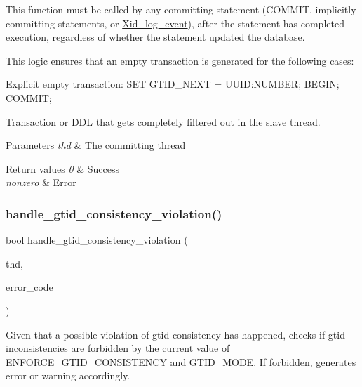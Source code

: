 This function must be called by any committing statement (C\+O\+M\+M\+IT, implicitly committing statements, or \mbox{\hyperlink{classXid__log__event}{Xid\+\_\+log\+\_\+event}}), after the statement has completed execution, regardless of whether the statement updated the database.

This logic ensures that an empty transaction is generated for the following cases\+:


\begin{DoxyItemize}
\item Explicit empty transaction\+: S\+ET G\+T\+I\+D\+\_\+\+N\+E\+XT = \textquotesingle{}U\+U\+ID\+:N\+U\+M\+B\+ER\textquotesingle{}; B\+E\+G\+IN; C\+O\+M\+M\+IT;
\item Transaction or D\+DL that gets completely filtered out in the slave thread.
\end{DoxyItemize}


\begin{DoxyParams}{Parameters}
{\em thd} & The committing thread\\
\hline
\end{DoxyParams}

\begin{DoxyRetVals}{Return values}
{\em 0} & Success \\
\hline
{\em nonzero} & Error \\
\hline
\end{DoxyRetVals}
\mbox{\label{group__Binary__Log_ga9f038ff4067e3f5be2b4dacc1e50ac72}} 
\subsubsection{\texorpdfstring{handle\+\_\+gtid\+\_\+consistency\+\_\+violation()}{handle\_gtid\_consistency\_violation()}}
{\footnotesize\ttfamily bool handle\+\_\+gtid\+\_\+consistency\+\_\+violation (\begin{DoxyParamCaption}\item[{T\+HD $\ast$}]{thd,  }\item[{int}]{error\+\_\+code }\end{DoxyParamCaption})}

Given that a possible violation of gtid consistency has happened, checks if gtid-\/inconsistencies are forbidden by the current value of E\+N\+F\+O\+R\+C\+E\+\_\+\+G\+T\+I\+D\+\_\+\+C\+O\+N\+S\+I\+S\+T\+E\+N\+CY and G\+T\+I\+D\+\_\+\+M\+O\+DE. If forbidden, generates error or warning accordingly.



